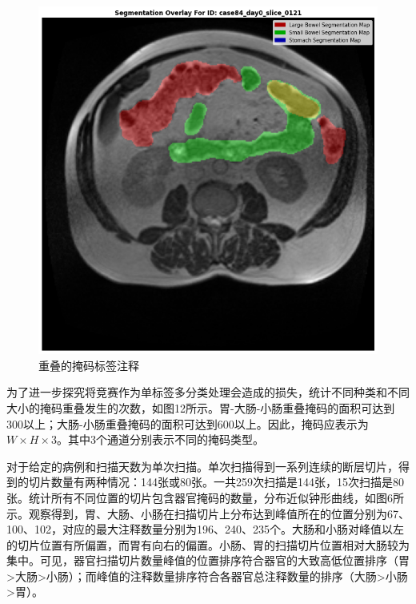 \documentclass[letterpaper, 10pt, conference, twoside]{ieeeconf}
\begin{document}
\begin{figure}[htbp]
  \centering
  \includegraphics[width = 1\linewidth]{seg_overlay.png}
  \caption{重叠的掩码标签注释}
  \label{fig:fig5}
\end{figure}

为了进一步探究将竞赛作为单标签多分类处理会造成的损失，统计不同种类和不同大小的掩码重叠发生的次数，如图12所示。胃-大肠-小肠重叠掩码的面积可达到300以上；大肠-小肠重叠掩码的面积可达到600以上。因此，掩码应表示为$W\times H\times 3$。其中3个通道分别表示不同的掩码类型。

对于给定的病例和扫描天数为单次扫描。单次扫描得到一系列连续的断层切片，得到的切片数量有两种情况：144张或80张。一共259次扫描是144张，15次扫描是80张。统计所有不同位置的切片包含器官掩码的数量，分布近似钟形曲线，如图6所示。观察得到，胃、大肠、小肠在扫描切片上分布达到峰值所在的位置分别为67、100、102，对应的最大注释数量分别为196、240、235个。大肠和小肠对峰值以左的切片位置有所偏置，而胃有向右的偏置。小肠、胃的扫描切片位置相对大肠较为集中。可见，器官扫描切片数量峰值的位置排序符合器官的大致高低位置排序（胃>大肠>小肠）；而峰值的注释数量排序符合各器官总注释数量的排序（大肠>小肠>胃）。
\end{document}
